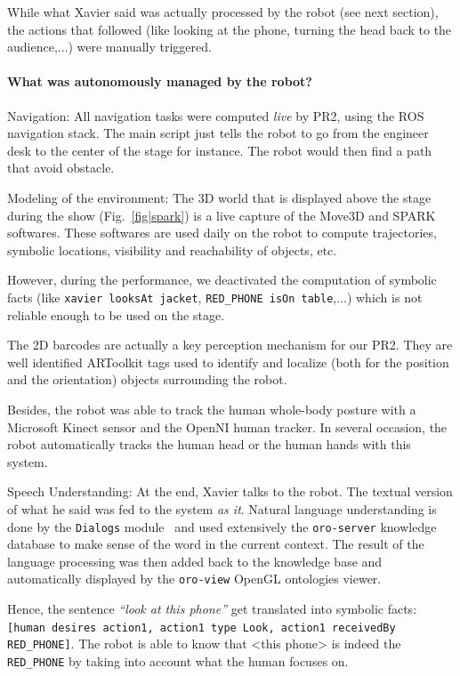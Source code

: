 While what Xavier said was actually processed by the robot (see next section),
the actions that followed (like looking at the phone, turning the head back to
the audience,...) were manually triggered.

\paragraph{What was autonomously managed by the robot?}

Navigation: All navigation tasks were computed \emph{live} by
PR2, using the ROS navigation stack. The main script just tells the robot to go
from the engineer desk to the center of the stage for instance. The robot would
then find a path that avoid obstacle.  

Modeling of the environment: The 3D world that is displayed above
the stage during the show (Fig.~\ref{fig|spark}) is a live capture of the
Move3D and SPARK softwares. These softwares are used daily on the robot to
compute trajectories, symbolic locations, visibility and reachability of
objects, etc.

However, during the performance, we deactivated the computation of symbolic
facts (like {\tt xavier looksAt jacket}, {\tt RED\_PHONE isOn table},...) which
is not reliable enough to be used on the stage.

The 2D barcodes are actually a key perception mechanism for our PR2. They are
well identified {\sc ARToolkit} tags used to identify and localize (both for the
position and the orientation) objects surrounding the robot.

Besides, the robot was able to track the human whole-body posture with a
Microsoft Kinect sensor and the {\sc OpenNI} human tracker. In several
occasion, the robot automatically tracks the human head or the human hands with
this system.

Speech Understanding: At the end, Xavier talks to the robot. The
textual version of what he said was fed to the system \emph{as it}. Natural
language understanding is done by the {\tt Dialogs}
module~\cite{Lemaignan2011a} and used extensively the {\tt oro-server} knowledge
database to make sense of the word in the current context. The result of the
language processing was then added back to the knowledge base and automatically
displayed by the {\tt oro-view} OpenGL ontologies viewer.

Hence, the sentence \emph{``look at this phone''} get translated into symbolic
facts: {\tt [human desires action1, action1 type Look, action1 receivedBy
RED\_PHONE]}. The robot is able to know that <this phone> is indeed the {\tt
RED\_PHONE} by taking into account what the human focuses on.

